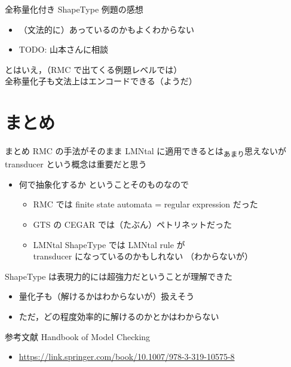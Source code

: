\documentclass[presentation, xetex]{beamer}
\begin{document}
\begin{frame}[label={sec:org2dd2e4c}]{全称量化付き ShapeType}
例題の感想
\begin{itemize}
\item （文法的に）あっているのかもよくわからない
\item TODO: 山本さんに相談
\end{itemize}


とはいえ，（RMC で出てくる例題レベルでは）\\
全称量化子も文法上はエンコードできる（ようだ）
\end{frame}


\section{まとめ}
\label{sec:org429b45c}

\begin{frame}[label={sec:org0861b58}]{まとめ}
RMC の手法がそのまま LMNtal に適用できるとは\textsubscript{あまり}思えないが\\
transducer という概念は重要だと思う
\begin{itemize}
\item \alert{\alert{何で抽象化するか}} ということそのものなので
\begin{itemize}
\item RMC では finite state automata = regular expression だった
\item GTS の CEGAR では（たぶん）ペトリネットだった
\item LMNtal ShapeType では LMNtal rule が \\
transducer になっているのかもしれない
（わからないが）
\end{itemize}
\end{itemize}


ShapeType は表現力的には超強力だということが理解できた
\begin{itemize}
\item 量化子も（解けるかはわからないが）扱えそう
\item ただ，どの程度効率的に解けるのかとかはわからない
\end{itemize}
\end{frame}


\begin{frame}[label={sec:org6d48b41}]{参考文献}
Handbook of Model Checking
\begin{itemize}
\item \url{https://link.springer.com/book/10.1007/978-3-319-10575-8}
\end{itemize}
\end{frame}
\end{document}
